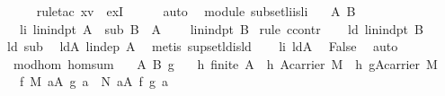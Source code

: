 \begin{isabellebody}
\ \ \ \ \isamarkupfalse%
\ {\isacharparenleft}rule{\isacharunderscore}tac\ x{\isacharequal}{\isachardoublequoteopen}v{\isachardoublequoteclose}\ \ exI{\isacharparenright}\isanewline
\ \ \ \ \isamarkupfalse%
\ auto\isanewline
{}\isamarkupfalse%
%
\endisatagproof
{\isafoldproof}%
%
\isadelimproof
\isanewline
%
\endisadelimproof
\isanewline
{}\isamarkupfalse%
\ {\isacharparenleft}\ module{\isacharparenright}\ subset{\isacharunderscore}li{\isacharunderscore}is{\isacharunderscore}li{\isacharcolon}\isanewline
\ \ \ A\ B\isanewline
\ \ \ li{\isacharcolon}\ {\isachardoublequoteopen}lin{\isacharunderscore}indpt\ A{\isachardoublequoteclose}\ \ sub{\isacharcolon}\ {\isachardoublequoteopen}B\ {\isasymsubseteq}\ A{\isachardoublequoteclose}\ \isanewline
\ \ \ {\isachardoublequoteopen}lin{\isacharunderscore}indpt\ B{\isachardoublequoteclose}\isanewline
%
\isadelimproof
%
\endisadelimproof
%
\isatagproof
{}\isamarkupfalse%
\ {\isacharparenleft}rule\ ccontr{\isacharparenright}\isanewline
\ \ \isamarkupfalse%
\ ld{\isacharcolon}\ {\isachardoublequoteopen}{\isasymnot}lin{\isacharunderscore}indpt\ B{\isachardoublequoteclose}\isanewline
\ \ \isamarkupfalse%
\ ld\ sub\ \isamarkupfalse%
\ ldA{\isacharcolon}\ {\isachardoublequoteopen}lin{\isacharunderscore}dep\ A{\isachardoublequoteclose}\ \isamarkupfalse%
\ {\isacharparenleft}metis\ supset{\isacharunderscore}ld{\isacharunderscore}is{\isacharunderscore}ld{\isacharparenright}\isanewline
\ \ \isamarkupfalse%
\ li\ ldA\ \isamarkupfalse%
\ False\ \isamarkupfalse%
\ auto\isanewline
{}\isamarkupfalse%
%
\endisatagproof
{\isafoldproof}%
%
\isadelimproof
\isanewline
%
\endisadelimproof
\isanewline
{}\isamarkupfalse%
\ {\isacharparenleft}\ mod{\isacharunderscore}hom{\isacharparenright}\ hom{\isacharunderscore}sum{\isacharcolon}\isanewline
\ \ \ A\ B\ g\isanewline
\ \ \ h{}{\isacharcolon}\ {\isachardoublequoteopen}finite\ A{\isachardoublequoteclose}\ \ h{}{\isacharcolon}\ {\isachardoublequoteopen}A{\isasymsubseteq}carrier\ M{\isachardoublequoteclose}\ \ h{}{\isacharcolon}\ {\isachardoublequoteopen}g{\isacharcolon}A{\isasymrightarrow}carrier\ M{\isachardoublequoteclose}\isanewline
\ \ \ {\isachardoublequoteopen}f\ {\isacharparenleft}{\isasymOplus}\isactrlbsub M\isactrlesub \ a{\isasymin}A{\isachardot}\ g\ a{\isacharparenright}\ {\isacharequal}\ {\isacharparenleft}{\isasymOplus}\isactrlbsub N\isactrlesub \ a{\isasymin}A{\isachardot}\ f\ {\isacharparenleft}g\ a{\isacharparenright}{\isacharparenright}{\isachardoublequoteclose}\isanewline

\end{isabellebody}
